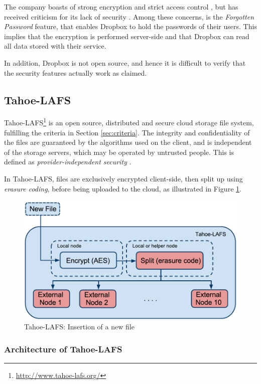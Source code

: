 \documentclass[pdftex,english,10pt,b5paper,twoside]{book}
\begin{document}
The company boasts of strong encryption and strict access control
\cite{dropbox_security}, but has received criticism for its lack of security
\cite{dropbox_concerns}. Among these concerns, is the \emph{Forgotten Password}
feature, that enables Dropbox to hold the passwords of their users. This
implies that the encryption is performed server-side and that Dropbox can read
all data stored with their service.

In addition, Dropbox is not open source, and hence it is difficult to verify
that the security features actually work as claimed.

\subsection{Tahoe-LAFS}
\label{sec:tahoe}

Tahoe-\ac{LAFS}\footnote{\url{http://www.tahoe-lafs.org/}} is an open source,
distributed and secure cloud storage file system, fulfilling the criteria in
Section \ref{sec:criteria}. The integrity and confidentiality of the
files are guaranteed by the algorithms used on the client, and is independent
of the storage servers, which may be operated by untrusted people.
This is defined as \emph{provider-independent security} \cite{tahoe}.

In Tahoe-\ac{LAFS}, files are exclusively encrypted client-side, then split up
using \emph{erasure coding}, before being uploaded to the cloud, as illustrated
in Figure \ref{fig:B:tahoe}.

\begin{figure}[h!]
    \centering
    \includegraphics[width=\columnwidth]{Tahoe-newfile.pdf}
    \caption{Tahoe-LAFS: Insertion of a new file}
    \label{fig:B:tahoe}
\end{figure}


\subsubsection{Architecture of Tahoe-LAFS}
\end{document}
